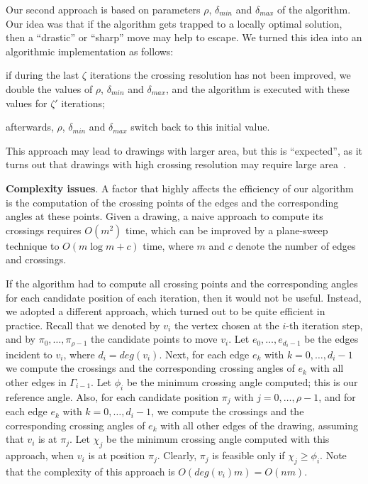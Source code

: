 \documentclass[runningheads]{llncs}
\newcommand{\myparagraph}[1]{\smallskip\noindent\textbf{#1}.}
\begin{document}
Our second approach is based on parameters $\rho$, $\delta_{min}$ and $\delta_{max}$ of the algorithm. Our idea was that if the algorithm gets trapped to a locally optimal solution, then a ``drastic'' or ``sharp'' move may help to escape. We turned this idea into an algorithmic implementation as follows:
%
\begin{inparaenum}[(i)]
\item if during the last $\zeta$ iterations the crossing resolution has not been improved, we double the values of $\rho$, $\delta_{min}$ and $\delta_{max}$, and the algorithm is executed with these values for $\zeta'$ iterations;
\item afterwards, $\rho$, $\delta_{min}$ and $\delta_{max}$ switch back to this initial value.
\end{inparaenum}
%
This approach may lead to drawings with larger area, but this is ``expected'', as it turns out that drawings with high crossing resolution may require large area~\cite{DBLP:journals/jgaa/AngeliniCDFBKS11,DBLP:journals/tcs/BrandenburgDEKL16}.

\myparagraph{Complexity issues}
%
A factor that highly affects the efficiency of our algorithm is the computation of the crossing points of the edges and the corresponding angles at these points. Given  a drawing, a naive approach to compute its crossings requires $O(m^2)$ time, which can be improved by a plane-sweep technique to $O(m \log m + c)$ time, where $m$ and $c$ denote the number of edges and crossings.

If the algorithm had to compute all crossing points and the corresponding angles for each candidate position of each iteration, then it would not be useful. Instead, we adopted a different approach, which turned out to be quite efficient in practice. Recall that we denoted by $v_i$ the vertex chosen at the $i$-th iteration step, and by $\pi_0,\ldots,\pi_{\rho-1}$ the candidate points to move $v_i$. Let $e_0,\ldots,e_{d_i-1}$ be the edges incident to $v_i$, where $d_i=deg(v_i)$. Next, for each edge $e_k$ with $k=0,\ldots,d_i-1$  we compute the crossings and the corresponding crossing angles of $e_k$ with all other edges in $\Gamma_{i-1}$. Let $\phi_i$ be the minimum crossing angle computed; this is our reference angle. Also, for each candidate position $\pi_j$ with $j=0,\ldots,\rho-1$, and for each edge $e_k$ with $k=0,\ldots,d_i-1$, we compute the crossings and the corresponding crossing angles of $e_k$ with all other edges of the drawing, assuming that $v_i$ is at $\pi_j$. Let $\chi_j$ be the minimum crossing angle computed with this approach, when $v_i$ is at position $\pi_j$. Clearly, $\pi_j$ is feasible only if $\chi_j \geq \phi_i$. Note that the complexity of this approach is $O(deg(v_i)m) = O(nm)$.
\end{document}
